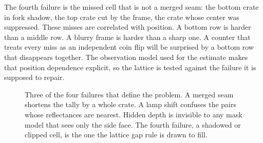The fourth failure is the missed cell that is not a merged seam: the bottom crate in fork shadow, the top crate cut by the frame, the crate whose center was suppressed. These misses are correlated with position. A bottom row is harder than a middle row. A blurry frame is harder than a sharp one. A counter that treats every miss as an independent coin flip will be surprised by a bottom row that disappears together. The observation model used for the estimate makes that position dependence explicit, so the lattice is tested against the failure it is supposed to repair.

\begin{figure}[t]
\centering
{}
\caption{Three of the four failures that define the problem. A merged seam shortens the tally by a whole crate. A lamp shift confuses the pairs whose reflectances are nearest. Hidden depth is invisible to any mask model that sees only the side face. The fourth failure, a shadowed or clipped cell, is the one the lattice gap rule is drawn to fill.}
\label{fig:failures}
\end{figure}

